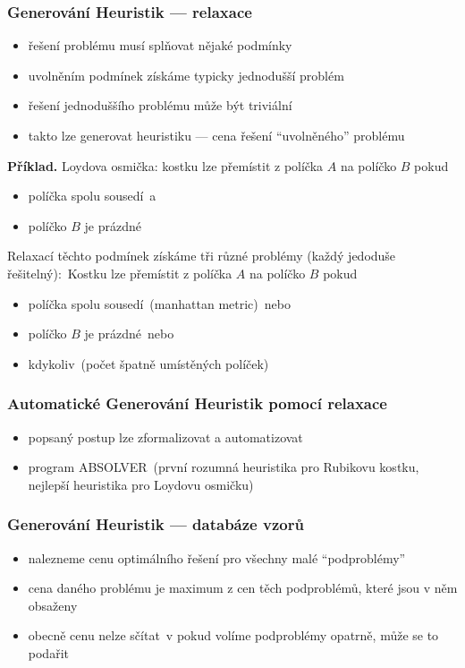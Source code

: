 \documentclass[red,handout,professionalfont]{beamer}
\theoremstyle{definition}
\newcommand{\0}{\mbox{${\bf 0}$}}
\renewcommand{\emph}[1]{{\bf #1}}
\begin{document}
\begin{frame}\frametitle{Generování Heuristik --- relaxace}
\pause
\begin{itemize}
 \item řešení problému musí splňovat nějaké podmínky\pause
 \item uvolněním podmínek získáme typicky jednodušší problém\pause
 \item řešení jednoduššího problému může být triviální\pause
 \item takto lze generovat heuristiku --- cena řešení ``uvolněného'' problému\pause
\end{itemize}
\emph{Příklad.} Loydova osmička: kostku lze přemístit z políčka $A$ na políčko $B$ pokud\pause
\begin{itemize}
  \item políčka spolu sousedí\pause\ a
  \item políčko $B$ je prázdné\pause
\end{itemize}
Relaxací těchto podmínek získáme tři různé problémy (každý jedoduše řešitelný):\pause\
Kostku lze přemístit z políčka $A$ na políčko $B$ pokud\pause
\begin{itemize}
  \item políčka spolu sousedí\pause\ (manhattan metric)\pause\ nebo
  \item políčko $B$ je prázdné\pause\ nebo
  \item kdykoliv\pause\ (počet špatně umístěných políček)
\end{itemize}
\end{frame}
\begin{frame}\frametitle{Automatické Generování Heuristik pomocí relaxace}
\begin{itemize}
 \item popsaný postup lze zformalizovat a automatizovat\pause
 \item program ABSOLVER\pause\ (první rozumná heuristika pro Rubikovu kostku, nejlepší heuristika pro Loydovu osmičku)
\end{itemize}
\end{frame}

\begin{frame}\frametitle{Generování Heuristik --- databáze vzorů}
\begin{itemize}
 \item nalezneme cenu optimálního řešení pro všechny malé ``podproblémy''\pause
 \item cena daného problému je maximum z cen těch podproblémů, které jsou v něm obsaženy\pause
 \item obecně cenu nelze sčítat\pause\ v pokud volíme podproblémy opatrně, může se to podařit
\end{itemize}
\end{frame}
\end{document}
